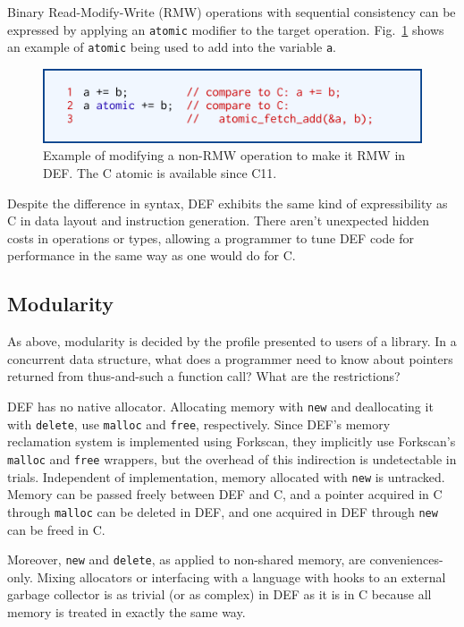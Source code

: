 Binary Read-Modify-Write (RMW) operations with sequential consistency can be expressed by applying an \texttt{atomic} modifier to the target operation.  Fig.~\ref{fig:atomic} shows an example of \texttt{atomic} being used to add into the variable \texttt{a}.

\begin{figure}[htbp!]
        \centering
        \includegraphics[scale=0.25]{gfx/atomic}
        \caption{Example of modifying a non-RMW operation to make it RMW in DEF.  The C atomic is available since C11.}
        \label{fig:atomic}
\end{figure}

Despite the difference in syntax, DEF exhibits the same kind of expressibility as C in data layout and instruction generation.  There aren't unexpected hidden costs in operations or types, allowing a programmer to tune DEF code for performance in the same way as one would do for C.

\subsection{Modularity}

As above, modularity is decided by the profile presented to users of a library.  In a concurrent data structure, what does a programmer need to know about pointers returned from thus-and-such a function call?  What are the restrictions?

DEF has no native allocator.  Allocating memory with \texttt{new} and deallocating it with \texttt{delete}, use \texttt{malloc} and \texttt{free}, respectively.  Since DEF's memory reclamation system is implemented using Forkscan, they implicitly use Forkscan's \texttt{malloc} and \texttt{free} wrappers, but the overhead of this indirection is undetectable in trials.  Independent of implementation, memory allocated with \texttt{new} is untracked.  Memory can be passed freely between DEF and C, and a pointer acquired in C through \texttt{malloc} can be deleted in DEF, and one acquired in DEF through \texttt{new} can be freed in C.

Moreover, \texttt{new} and \texttt{delete}, as applied to non-shared memory, are conveniences-only.  Mixing allocators or interfacing with a language with hooks to an external garbage collector is as trivial (or as complex) in DEF as it is in C because all memory is treated in exactly the same way.

